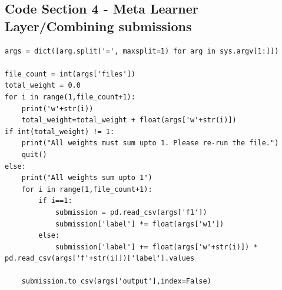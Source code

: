 \documentclass[10pt,onecolumn]{IEEEtran}
\begin{document}
\subsection*{Code Section 4 - Meta Learner Layer/Combining submissions}
{\scriptsize
\begin{Verbatim}
args = dict([arg.split('=', maxsplit=1) for arg in sys.argv[1:]])

file_count = int(args['files'])
total_weight = 0.0
for i in range(1,file_count+1):
	print('w'+str(i))
	total_weight=total_weight + float(args['w'+str(i)])
if int(total_weight) != 1:
	print("All weights must sum upto 1. Please re-run the file.")
	quit()
else:
	print("All weights sum upto 1")
	for i in range(1,file_count+1):
		if i==1:
			submission = pd.read_csv(args['f1'])
			submission['label'] *= float(args['w1'])
		else:
			submission['label'] += float(args['w'+str(i)]) * pd.read_csv(args['f'+str(i)])['label'].values

	submission.to_csv(args['output'],index=False)

\end{Verbatim}
}
\end{document}
